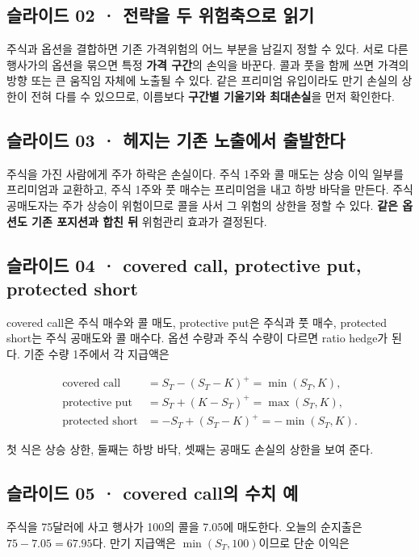 \documentclass[11pt,a4paper]{article}
\begin{document}
\subsection{슬라이드 02 · 전략을 두 위험축으로 읽기}
주식과 옵션을 결합하면 기존 가격위험의 어느 부분을 남길지 정할 수 있다. 서로 다른 행사가의 옵션을 묶으면 특정 \textbf{가격 구간}의 손익을 바꾼다. 콜과 풋을 함께 쓰면 가격의 방향 또는 큰 움직임 자체에 노출될 수 있다. 같은 프리미엄 유입이라도 만기 손실의 상한이 전혀 다를 수 있으므로, 이름보다 \textbf{구간별 기울기와 최대손실}을 먼저 확인한다.\par

\subsection{슬라이드 03 · 헤지는 기존 노출에서 출발한다}
주식을 가진 사람에게 주가 하락은 손실이다. 주식 1주와 콜 매도는 상승 이익 일부를 프리미엄과 교환하고, 주식 1주와 풋 매수는 프리미엄을 내고 하방 바닥을 만든다. 주식 공매도자는 주가 상승이 위험이므로 콜을 사서 그 위험의 상한을 정할 수 있다. \textbf{같은 옵션도 기존 포지션과 합친 뒤} 위험관리 효과가 결정된다.\par

\subsection{슬라이드 04 · covered call, protective put, protected short}
covered call은 주식 매수와 콜 매도, protective put은 주식과 풋 매수, protected short는 주식 공매도와 콜 매수다. 옵션 수량과 주식 수량이 다르면 ratio hedge가 된다. 기준 수량 1주에서 각 지급액은\par

\[
\begin{aligned}
\text{covered call}&=S_T-(S_T-K)^+=\min(S_T,K),\\
\text{protective put}&=S_T+(K-S_T)^+=\max(S_T,K),\\
\text{protected short}&=-S_T+(S_T-K)^+=-\min(S_T,K).
\end{aligned}
\]

첫 식은 상승 상한, 둘째는 하방 바닥, 셋째는 공매도 손실의 상한을 보여 준다.\par

\subsection{슬라이드 05 · covered call의 수치 예}
주식을 75달러에 사고 행사가 100의 콜을 7.05에 매도한다. 오늘의 순지출은 $75-7.05=67.95$다. 만기 지급액은 $\min(S_T,100)$이므로 단순 이익은\par
\end{document}
